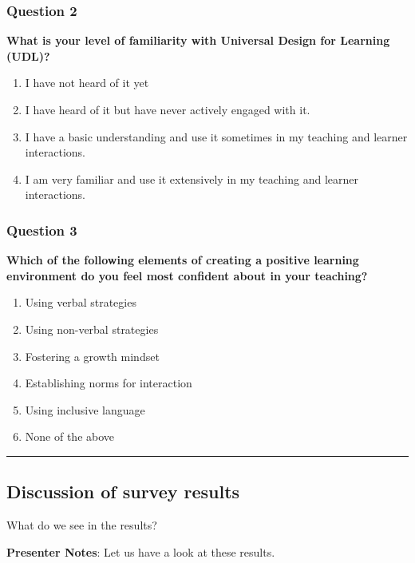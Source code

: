 \documentclass[
  letterpaper,
  DIV=11,
  numbers=noendperiod]{scrartcl}
\begin{document}
\subsubsection{Question 2}

\textbf{What is your level of familiarity with Universal Design for
Learning (UDL)?}

\begin{enumerate}
\def\labelenumi{\alph{enumi}.}
\item
  I have not heard of it yet
\item
  I have heard of it but have never actively engaged with it.
\item
  I have a basic understanding and use it sometimes in my teaching and
  learner interactions.
\item
  I am very familiar and use it extensively in my teaching and learner
  interactions.
\end{enumerate}

\subsubsection{Question 3}

\textbf{Which of the following elements of creating a positive learning
environment do you feel most confident about in your teaching?}

\begin{enumerate}
\def\labelenumi{\alph{enumi}.}
\item
  Using verbal strategies
\item
  Using non-verbal strategies
\item
  Fostering a growth mindset
\item
  Establishing norms for interaction
\item
  Using inclusive language
\item
  None of the above
\end{enumerate}

\begin{center}\rule{0.5\linewidth}{0.5pt}\end{center}

\subsection{Discussion of survey
results}\label{discussion-of-survey-results}

What do we see in the results?

\textbf{Presenter Notes}: Let us have a look at these results.
\end{document}
